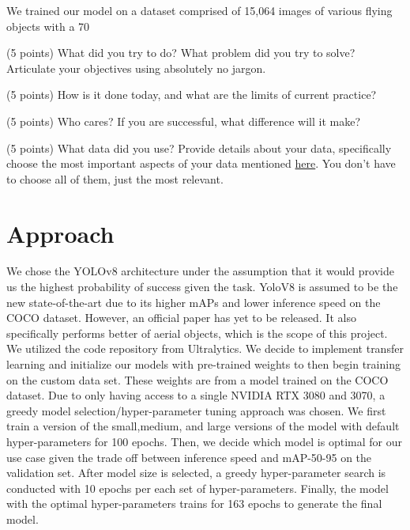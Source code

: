 \documentclass[10pt,twocolumn,letterpaper]{article}
\begin{document}
We trained our model on a dataset comprised of 15,064 images of various flying objects with a 70%


(5 points) What did you try to do? What problem did you try to solve? Articulate your objectives using absolutely no jargon. 

(5 points) How is it done today, and what are the limits of current practice?

(5 points) Who cares? If you are successful, what difference will it make? 

(5 points) What data did you use? Provide details about your data, specifically choose the most important aspects of your data mentioned \href{https://arxiv.org/abs/1803.09010}{here}. You don’t have to choose all of them, just the most relevant.

\section{Approach}

We chose the YOLOv8 architecture under the assumption that it would provide us the highest probability of success given the task. YoloV8 is 
assumed to be the new state-of-the-art due to its higher mAPs and lower inference speed on the COCO dataset. However, an official paper has 
yet to be released. It also specifically performs better of aerial objects, which is the scope of this project. We utilized the code repository 
from Ultralytics. We decide to implement transfer learning and initialize our models with pre-trained weights to then begin training on the 
custom data set. These weights are from a model trained on the COCO dataset. Due to only having access to a single NVIDIA RTX 3080 and 3070, 
a greedy model selection/hyper-parameter tuning approach was chosen. We first train a version of the small,medium, and large versions of the 
model with default hyper-parameters for 100 epochs. Then, we decide which model is optimal for our use case given the trade off between inference 
speed and mAP-50-95 on the validation set. After model size is selected, a greedy hyper-parameter search is conducted with 10 epochs per each 
set of hyper-parameters. Finally, the model with the optimal hyper-parameters trains for 163 epochs to generate the final model.
\end{document}

